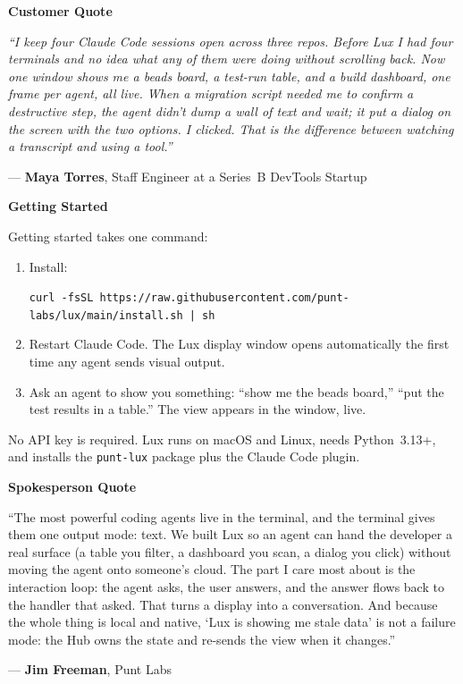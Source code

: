 \documentclass[11pt,letterpaper]{article}
\newcommand{\prsection}[1]{%
  \vspace{1em}%
  {\large\bfseries\color{SectionBlue}#1}%
  \vspace{0.3em}\par%
}
\begin{document}
\prsection{Customer Quote}

\begin{customerquote}
\textit{``I keep four Claude Code sessions open across three repos. Before Lux I
had four terminals and no idea what any of them were doing without scrolling
back. Now one window shows me a beads board, a test-run table, and a build
dashboard, one frame per agent, all live. When a migration script needed me
to confirm a destructive step, the agent didn't dump a wall of text and wait;
it put a dialog on the screen with the two options. I clicked. That is the
difference between watching a transcript and using a tool.''}

\raggedleft --- \textbf{Maya Torres}, Staff Engineer at a Series~B DevTools Startup
\end{customerquote}

\prsection{Getting Started}

Getting started takes one command:

\begin{enumerate}[nosep]
  \item Install:

    {\small\texttt{curl -fsSL https://raw.githubusercontent.com/\allowbreak punt-labs/lux/main/install.sh | sh}}
  \item Restart Claude Code. The Lux display window opens automatically the
    first time any agent sends visual output.
  \item Ask an agent to show you something: ``show me the beads board,''
    ``put the test results in a table.'' The view appears in the window, live.
\end{enumerate}

No API key is required. Lux runs on macOS and Linux, needs Python~3.13+, and
installs the \texttt{punt-lux} package plus the Claude Code plugin.

\prsection{Spokesperson Quote}

\begin{spokespersonquote}
``The most powerful coding agents live in the terminal, and the terminal gives
them one output mode: text. We built Lux so an agent can hand the developer a
real surface (a table you filter, a dashboard you scan, a dialog you click)
without moving the agent onto someone's cloud. The part I care most about is
the interaction loop: the agent asks, the user answers, and the answer flows
back to the handler that asked. That turns a display into a conversation. And
because the whole thing is local and native, `Lux is showing me stale data' is
not a failure mode: the Hub owns the state and re-sends the view when it
changes.''

\raggedleft --- \textbf{Jim Freeman}, Punt Labs
\end{spokespersonquote}
\end{document}
